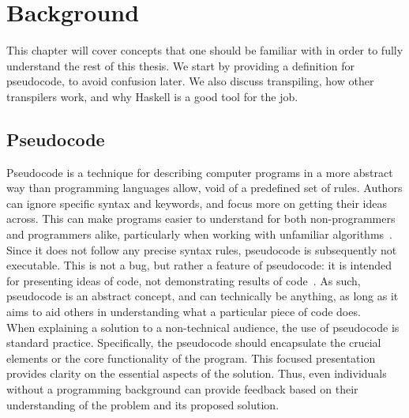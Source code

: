 \chapter{Background} %




This chapter will cover concepts that one should be familiar with in order to fully understand the rest of this thesis. We start by providing a definition for pseudocode, to avoid confusion later. We also discuss transpiling, how other transpilers work, and why Haskell is a good tool for the job.

\section{Pseudocode}

Pseudocode is a technique for describing computer programs in a more abstract way than programming languages allow, void of a predefined set of rules. Authors can ignore specific syntax and keywords, and focus more on getting their ideas across. This can make programs easier to understand for both non-programmers and programmers alike, particularly when working with unfamiliar algorithms~\cite{LinfoAlgorithmsIntro2007}. \hfill \\

Since it does not follow any precise syntax rules, pseudocode is subsequently not executable. This is not a bug, but rather a feature of pseudocode: it is intended for presenting ideas of code, not demonstrating results of code~\cite{LogicsofSpecificationLanguages}. As such, pseudocode is an abstract concept, and can technically be anything, as long as it aims to aid others in understanding what a particular piece of code does. \hfill \\

When explaining a solution to a non-technical audience, the use of pseudocode is standard practice. Specifically, the pseudocode should encapsulate the crucial elements or the core functionality of the program. This focused presentation provides clarity on the essential aspects of the solution. Thus, even individuals without a programming background can provide feedback based on their understanding of the problem and its proposed solution. \hfill \\

